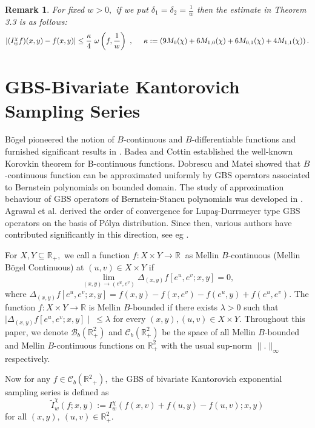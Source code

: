 \documentclass[12pt]{article}
\newtheorem{rmk}{Remark}[section]
\begin{document}
{\begin{rmk}
For fixed $w>0,$ if we put $\delta_{1}=\delta_{2}= \frac{1}{w}$ then the estimate in Theorem 3.3 is as follows:
$$ |(I_{w}^{\chi}f)(x,y) - f(x,y)| \leq \frac{\kappa}{4} \ \omega \left(f, \frac{1}{w} \right)\ , \hspace{0.5cm} \kappa := \left( 9 M_{0}(\chi)+ 6 M_{1,0}(\chi)+6 M_{0,1}(\chi)+ 4 M_{1,1}(\chi) \right).$$
\end{rmk}

\section{GBS-Bivariate Kantorovich Sampling Series}
 B\"{o}gel pioneered the notion of $B$-continuous and $B$-differentiable functions and furnished significant results in \cite{BOG1,BOG2}. Badea and Cottin \cite{badea,BAD2} established the well-known Korovkin theorem for B-continuous functions. Dobrescu and Matei \cite{DOB} showed that $B$-continuous function can be approximated uniformly by GBS operators associated to Bernstein polynomials on bounded domain. The study of approximation behaviour of GBS operators of Bernstein-Stancu polynomials was developed in \cite{MIC}. Agrawal et al. \cite{PNA6} derived the order of convergence for Lupa\c{s}-Durrmeyer type GBS operators on the basis of P\'{o}lya distribution. Since then, various authors have contributed significantly in this direction, see eg \cite{PNA3,BAR,KAJ,POP,own1,ruchi,acar}.

For $X, Y \subseteq \mathbb{R}_{+},$ we call a function $f:X\times Y \rightarrow \mathbb{R}\ $ as Mellin $B$-continuous (Mellin B\"{o}gel Continuous) at $(u,v)\in X \times Y $ if
$$\lim_{(x,y)\rightarrow (e^u,e^v)}\Delta_{(x,y)}f[e^u,e^v;x,y]=0,$$
where $\Delta_{(x,y)}f[e^u,e^v;x,y]=f(x,y)-f(x,e^v)-f(e^u,y)+f(e^u,e^v).$ The function $f:X\times Y \rightarrow \mathbb{R}$ is Mellin $B$-bounded if there exists $\lambda>0$ such that $\mid\Delta_{(x,y)}f[e^u,e^v;x,y]\mid \ \leq \lambda$ for every $(x,y), (u,v)\in X\times Y .$
Throughout this paper, we denote $\mathcal{B}_{b}(\mathbb{R}^{2}_{+})$ and $\mathcal{C}_{b}(\mathbb{R}^{2}_{+})$ be the space of all Mellin $B$-bounded and Mellin $B$-continuous functions on $\mathbb{R}^{2}_{+}$ with the usual sup-norm $ \|. \|_{\infty}$ respectively.

Now for any $f\in \mathcal{C}_{b}(\mathbb{R}{^2}_{+}),$ the GBS of bivariate Kantorovich exponential sampling series is defined as
$$ \tilde{I}_{w}^{\chi}(f;x,y) :=  I_{w}^{\chi}(f(x,v)+f(u,y)-f(u,v); x,y)$$
for all $ (x,y), \ (u,v) \in \mathbb{R}^{2}_{+}.$

}
\end{document}
